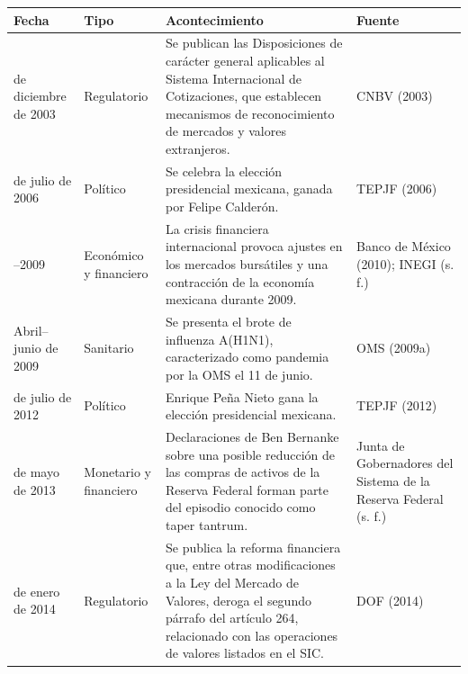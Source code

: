 {\small
\begin{longtable}[]{@{}
  >{\raggedright\arraybackslash}p{}
  >{\raggedright\arraybackslash}p{}
  >{\raggedright\arraybackslash}p{}
  >{\raggedright\arraybackslash}p{}@{}}
\toprule\noalign{}
\begin{minipage}[b]{\linewidth}\raggedright
\textbf{Fecha}
\end{minipage} & \begin{minipage}[b]{\linewidth}\raggedright
\textbf{Tipo}
\end{minipage} & \begin{minipage}[b]{\linewidth}\raggedright
\textbf{Acontecimiento}
\end{minipage} & \begin{minipage}[b]{\linewidth}\raggedright
\textbf{Fuente}
\end{minipage} \\
\midrule\noalign{}
\endhead
\bottomrule\noalign{}
\endlastfoot
18 de diciembre de 2003 & Regulatorio & Se publican las Disposiciones de carácter general aplicables al Sistema Internacional de Cotizaciones, que establecen mecanismos de reconocimiento de mercados y valores extranjeros. & CNBV (2003) \\
2 de julio de 2006 & Político & Se celebra la elección presidencial mexicana, ganada por Felipe Calderón. & TEPJF (2006) \\
2008--2009 & Económico y financiero & La crisis financiera internacional provoca ajustes en los mercados bursátiles y una contracción de la economía mexicana durante 2009. & Banco de México (2010); INEGI (s. f.) \\
Abril--junio de 2009 & Sanitario & Se presenta el brote de influenza A(H1N1), caracterizado como pandemia por la OMS el 11 de junio. & OMS (2009a) \\
1 de julio de 2012 & Político & Enrique Peña Nieto gana la elección presidencial mexicana. & TEPJF (2012) \\
22 de mayo de 2013 & Monetario y financiero & Declaraciones de Ben Bernanke sobre una posible reducción de las compras de activos de la Reserva Federal forman parte del episodio conocido como taper tantrum. & Junta de Gobernadores del Sistema de la Reserva Federal (s. f.) \\
10 de enero de 2014 & Regulatorio & Se publica la reforma financiera que, entre otras modificaciones a la Ley del Mercado de Valores, deroga el segundo párrafo del artículo 264, relacionado con las operaciones de valores listados en el SIC. & DOF (2014) \\

\end{longtable}}
